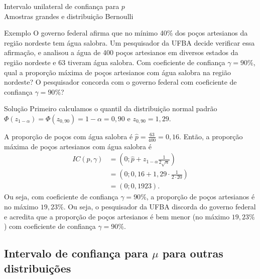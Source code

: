 \documentclass[8pt]{beamer}
\begin{document}
\begin{frame}{Intervalo unilateral de confiança para $p$\\ Amostras grandes e distribuição Bernoulli}

\small

\begin{block}{Exemplo}
	O governo federal afirma que no mínimo 40\% dos poços artesianos da região nordeste tem água salobra. Um pesquisador da UFBA decide verificar essa afirmação, e analisou a água de 400 poços artesianos em diversos estados da região nordeste e 63 tiveram água salobra. Com coeficiente de confiança $\gamma=90\%$, qual a proporção máxima de poços artesianos com água salobra na região nordeste? O pesquisador concorda com o governo federal com coeficiente de confiança $\gamma=90\%$?
	
\end{block}

\begin{block}{Solução}
	Primeiro calculamos o quantil da distribuição normal padrão $\Phi\left( z_{1 - \alpha} \right) = \Phi\left( z_{0,90} \right) = 1-\alpha = 0,90$ e $z_{0,90} = 1,29$.
	
	
	A proporção de poços com água salobra é $\hat{p} = \frac{63}{400} = 0,16$.  Então, a proporção máxima de poços artesianos com água salobra é
	\begin{align*}
		IC(p, \gamma) &= \left( 0; \hat{p} + z_{1 - \alpha} \frac{1}{2 \sqrt{n}} \right)\\
		&= \left( 0; 0,16 + 1,29 \cdot \frac{1}{2 \cdot 20} \right)\\
		&= (0; 0,1923).
	\end{align*}
	Ou seja, com coeficiente de confiança $\gamma=90\%$, a proporção de poços artesianos é no máximo $19,23\%$. Ou seja, o pesquisador da UFBA discorda do governo federal e acredita que a proporção de poços artesianos é bem menor (no máximo $19,23\%$) com coeficiente de confiança $\gamma=90\%$.
\end{block}

\normalsize

\end{frame}

\subsection{Intervalo de confiança para $\mu$ para outras distribuições}
\end{document}
